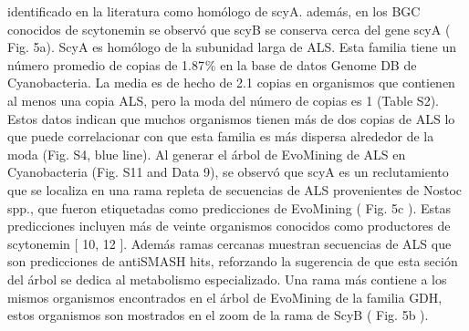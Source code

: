 \documentclass[12pt,twoside]{reedthesis}
\begin{document}
  identificado en la literatura como homólogo de scyA. además, en los BGC
  conocidos de scytonemin se observó que scyB se conserva cerca del gene
  scyA ( Fig. 5a). ScyA es homólogo de la subunidad larga de ALS. Esta
  familia tiene un número promedio de copias de 1.87 \% en la base de
  datos Genome DB de Cyanobacteria. La media es de hecho de 2.1 copias en
  organismos que contienen al menos una copia ALS, pero la moda del número
  de copias es 1 (Table S2). Estos datos indican que muchos organismos
  tienen más de dos copias de ALS lo que puede correlacionar con que esta
  familia es más dispersa alrededor de la moda (Fig. S4, blue line). Al
  generar el árbol de EvoMining de ALS en Cyanobacteria (Fig. S11 and Data
  9), se observó que scyA es un reclutamiento que se localiza en una rama
  repleta de secuencias de ALS provenientes de Nostoc spp., que fueron
  etiquetadas como predicciones de EvoMining ( Fig. 5c ). Estas
  predicciones incluyen más de veinte organismos conocidos como
  productores de scytonemin {[} 10, 12 {]}. Además ramas cercanas muestran
  secuencias de ALS que son predicciones de antiSMASH hits, reforzando la
  sugerencia de que esta seción del árbol se dedica al metabolismo
  especializado. Una rama más contiene a los mismos organismos encontrados
  en el árbol de EvoMining de la familia GDH, estos organismos son
  mostrados en el zoom de la rama de ScyB ( Fig. 5b ).
  
\end{document}
